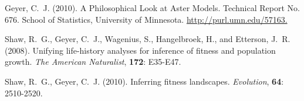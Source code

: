 \documentclass[12pt]{article}
\begin{document}
\begin{thebibliography}{}
Geyer, C.~J. (2010).
\newblock A Philosophical Look at Aster Models. Technical Report
No. 676. School of Statistics, University of Minnesota.
\newblock \url{http://purl.umn.edu/57163.}








Shaw, R.~G., Geyer, C.~J., Wagenius, S., Hangelbroek, H., and Etterson, J.~R. (2008).
\newblock Unifying life-history analyses for 
inference of fitness and population growth.
\newblock \emph{The American Naturalist}, \textbf{172}: E35-E47.


Shaw, R.~G., Geyer, C.~J. (2010).
\newblock Inferring fitness landscapes.
\newblock \emph{Evolution}, \textbf{64}: 2510-2520.

\end{thebibliography}
\end{document}
